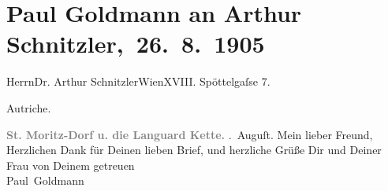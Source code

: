 

         
         \renewcommand{\erwaehntePersonen}{Personen: Paul Goldmann, Olga Schnitzler}
         \renewcommand{\erwaehnteOrte}{Orte: Edmund-Weiß-Gasse 7, Piz Languard, Sankt Moritz, Wien, Österreich-Ungarn}
         \renewcommand{\erwaehnteWerke}{}
               \section[ Paul Goldmann an Arthur Schnitzler, 26. 8. 1905]{ Paul Goldmann an Arthur Schnitzler, 26. 8. 1905}\nopagebreak{}\rehead{ }\begin{ledgroupsized}[t]{13cm}\normalsize\beginnumbering \toendnotes[C]{\smallbreak\pagebreak[2]} 
\toendnotes[C]{\smallbreak}\pstart{}{\pb}Herrn\pend{}\pstart{}Dr. Arthur Schnitzler\pend{}\pstart{}Wien\pend{}\pstart{}XVIII. Spöttelgaſse 7.\pend{}\pstart{}\begin{otherlanguage}{french}Autriche.\end{otherlanguage}\pend{}{\bigskip}\pstart
           \noindent{}\centering{}{\pb}\textcolor{gray}{\textbf{\textbf{St. Moritz-Dorf} u. die Languard Kette.}}\pend
           . Auguſt.\pend
           \pstart{}Mein lieber Freund,\pend\pstart
           Herzlichen Dank für Deinen lieben Brief, und herzliche Grüße Dir und Deiner Frau von Deinem getreuen {\\}\spacefill\mbox{Paul Goldmann}\pend
           
         
         \endnumbering{}\end{ledgroupsized}  \newcommand{\dateiname}{L03235}\newcommand{\titel}{Paul Goldmann an Arthur Schnitzler, 26. 8. 1905}\newcommand{\editorInnen}{Martin Anton Müller und Laura Untner}
      